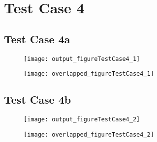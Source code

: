 \section{Test Case 4}
\subsection{Test Case 4a}
\begin{figure}
  \centering
  \texttt{[image: output\_figureTestCase4\_1]}
  \caption{}\label{figure_testcase4_1}
\end{figure}

\begin{figure}
  \centering
  \texttt{[image: overlapped\_figureTestCase4\_1]}
  \caption{}\label{figure_testcase4_1_overlapped}
\end{figure}

\subsection{Test Case 4b}
\begin{figure}
  \centering
  \texttt{[image: output\_figureTestCase4\_2]}
  \caption{}\label{figure_testcase4_2}
\end{figure}

\begin{figure}
  \centering
  \texttt{[image: overlapped\_figureTestCase4\_2]}
  \caption{}\label{figure_testcase4_2_overlapped}
\end{figure}
